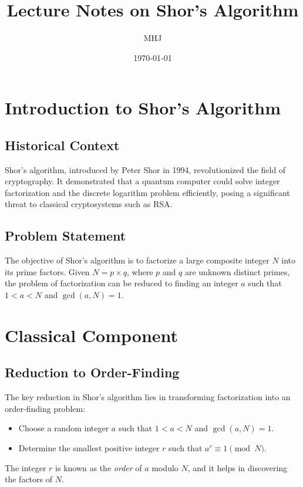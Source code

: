 \documentclass{article}
\title{Lecture Notes on Shor's Algorithm}
\author{MHJ}
\date{\today}
\begin{document}
\maketitle

\tableofcontents
\newpage

\section{Introduction to Shor's Algorithm}

\subsection{Historical Context}
Shor's algorithm, introduced by Peter Shor in 1994, revolutionized the field of cryptography. It demonstrated that a quantum computer could solve integer factorization and the discrete logarithm problem efficiently, posing a significant threat to classical cryptosystems such as RSA.

\subsection{Problem Statement}
The objective of Shor's algorithm is to factorize a large composite integer \( N \) into its prime factors. Given \( N = p \times q \), where \( p \) and \( q \) are unknown distinct primes, the problem of factorization can be reduced to finding an integer \( a \) such that \( 1 < a < N \) and \( \gcd(a, N) = 1 \).

\section{Classical Component}

\subsection{Reduction to Order-Finding}
The key reduction in Shor's algorithm lies in transforming factorization into an order-finding problem:
\begin{itemize}
    \item Choose a random integer \( a \) such that \( 1 < a < N \) and \( \gcd(a, N) = 1 \).
    \item Determine the smallest positive integer \( r \) such that \( a^r \equiv 1 \pmod{N} \).
\end{itemize}
The integer \( r \) is known as the \textit{order} of \( a \) modulo \( N \), and it helps in discovering the factors of \( N \).
\end{document}
